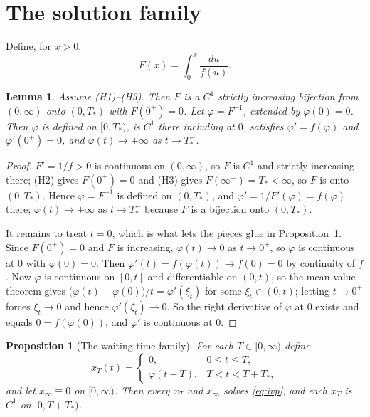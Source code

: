 \documentclass[12pt]{article}
\theoremstyle{plain}
\newtheorem{lemma}[theorem]{Lemma}
\newtheorem{proposition}[theorem]{Proposition}
\theoremstyle{definition}
\theoremstyle{remark}
\begin{document}
\section{The solution family}\label{sec:family}

Define, for $x>0$,
\begin{equation}\label{eq:F}
  F(x)=\int_{0}^{x}\frac{du}{f(u)} .
\end{equation}

\begin{lemma}\label{lem:phi}
Assume \textup{(H1)--(H3)}. Then $F$ is a $C^{1}$ strictly increasing bijection
from $(0,\infty)$ onto $(0,T_{*})$ with $F(0^{+})=0$. Let $\varphi=F^{-1}$,
extended by $\varphi(0)=0$. Then $\varphi$ is defined on $[0,T_{*})$, is $C^{1}$
there including at $0$, satisfies $\varphi'=f(\varphi)$ and $\varphi'(0^{+})=0$,
and $\varphi(t)\to+\infty$ as $t\to T_{*}^{-}$.
\end{lemma}

\begin{proof}
$F'=1/f>0$ is continuous on $(0,\infty)$, so $F$ is $C^{1}$ and strictly
increasing there; (H2) gives $F(0^{+})=0$ and (H3) gives
$F(\infty^{-})=T_{*}<\infty$, so $F$ is onto $(0,T_{*})$. Hence $\varphi=F^{-1}$
is defined on $(0,T_{*})$, and $\varphi'=1/F'(\varphi)=f(\varphi)$ there;
$\varphi(t)\to+\infty$ as $t\to T_{*}^{-}$ because $F$ is a bijection onto
$(0,T_{*})$.

It remains to treat $t=0$, which is what lets the pieces glue in
Proposition~\ref{prop:xT}. Since $F(0^{+})=0$ and $F$ is increasing,
$\varphi(t)\to 0$ as $t\to0^{+}$, so $\varphi$ is continuous at $0$ with
$\varphi(0)=0$. Then $\varphi'(t)=f(\varphi(t))\to f(0)=0$ by continuity of $f$.
Now $\varphi$ is continuous on $[0,t]$ and differentiable on $(0,t)$, so the
mean value theorem gives $\big(\varphi(t)-\varphi(0)\big)/t=\varphi'(\xi_{t})$
for some $\xi_{t}\in(0,t)$; letting $t\to0^{+}$ forces $\xi_{t}\to0$ and hence
$\varphi'(\xi_{t})\to0$. So the right derivative of $\varphi$ at $0$ exists and
equals $0=f(\varphi(0))$, and $\varphi'$ is continuous at $0$.
\end{proof}

\begin{proposition}[The waiting-time family]\label{prop:xT}
For each $T\in[0,\infty)$ define
\[
  x_{T}(t)=\begin{cases}
    0, & 0\le t\le T,\\[2pt]
    \varphi(t-T), & T<t<T+T_{*},
  \end{cases}
\]
and let $x_{\infty}\equiv 0$ on $[0,\infty)$. Then every $x_{T}$ and $x_{\infty}$
solves \eqref{eq:ivp}, and each $x_{T}$ is $C^{1}$ on $[0,T+T_{*})$.
\end{proposition}
\end{document}
